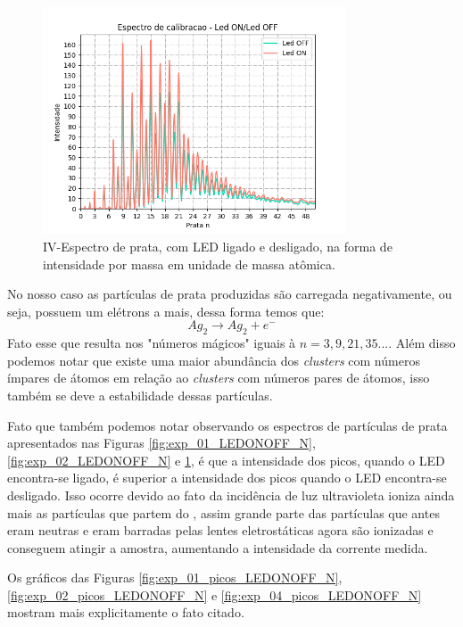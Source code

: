 \begin{figure}
  \centering  
  \includegraphics[width=0.8\textwidth]{exp_04/LED_ON_Led_OFF_espectro_calib_prata_N_.png}
  \caption{IV-Espectro de prata, com LED ligado e desligado, na forma de intensidade por massa em unidade de massa atômica.}
  \label{fig:exp_04_LEDONOFF_N}
\end{figure}



 No nosso caso as partículas de prata produzidas são carregada negativamente, ou seja, possuem um elétrons a mais, dessa forma temos que:
  \begin{equation*}
    Ag_{2} \to Ag_{2} + e^{-}
\end{equation*} 
 Fato esse que resulta nos "números mágicos" iguais à $n= 3,9,21,35...$. Além disso podemos notar que existe uma maior abundância dos \textit{clusters} com números ímpares de átomos em relação ao \textit{clusters} com números pares de átomos, isso também se deve a estabilidade dessas partículas.
 
 Fato que também podemos notar observando os espectros de partículas de prata apresentados nas Figuras \ref{fig:exp_01_LEDONOFF_N}, \ref{fig:exp_02_LEDONOFF_N} e \ref{fig:exp_04_LEDONOFF_N}, é que a intensidade dos picos, quando o LED encontra-se ligado, é superior a intensidade dos picos quando o LED encontra-se desligado. Isso ocorre devido ao fato da incidência de luz ultravioleta ioniza ainda mais as partículas que partem do , assim grande parte das partículas que antes eram neutras e eram barradas pelas lentes eletrostáticas agora são ionizadas e conseguem atingir a amostra, aumentando a intensidade da corrente medida.
 
 Os gráficos das Figuras \ref{fig:exp_01_picos_LEDONOFF_N}, \ref{fig:exp_02_picos_LEDONOFF_N} e \ref{fig:exp_04_picos_LEDONOFF_N} mostram mais explicitamente o fato citado.
 
